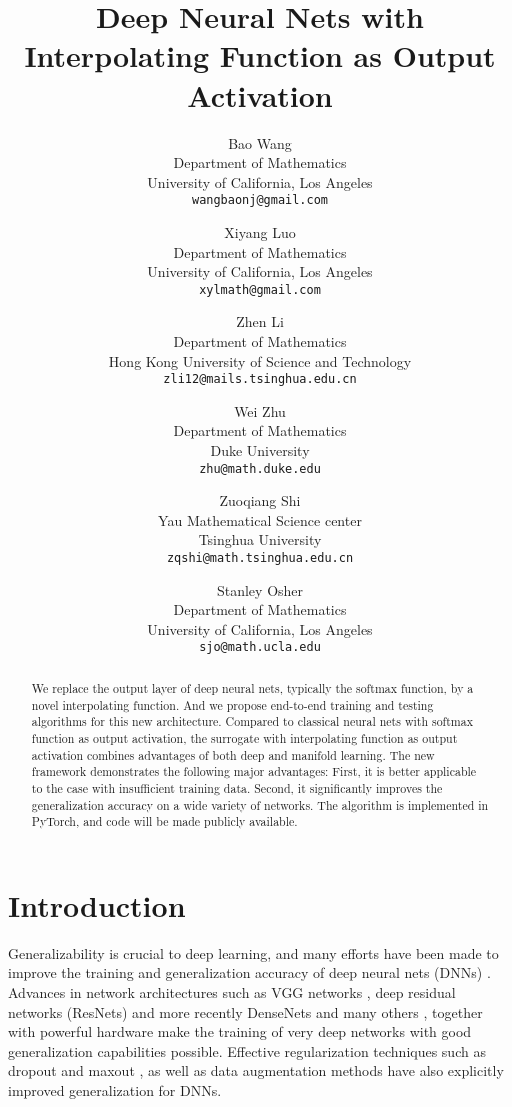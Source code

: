 \documentclass{article}
\title{Deep Neural Nets with Interpolating Function as Output Activation}
\author{
  Bao Wang \\
  Department of Mathematics\\
  University of California, Los Angeles\\
   \texttt{wangbaonj@gmail.com} \\
  \and
  Xiyang Luo \\
  Department of Mathematics\\
  University of California, Los Angeles\\
   \texttt{xylmath@gmail.com} \\
  \and
  Zhen Li \\
  Department of Mathematics\\
  Hong Kong University of Science and Technology\\
   \texttt{zli12@mails.tsinghua.edu.cn} \\
\and
  Wei Zhu \\
  Department of Mathematics\\
  Duke University\\
  \texttt{zhu@math.duke.edu} \\
\and
  Zuoqiang Shi \\
  Yau Mathematical Science center\\
  Tsinghua University\\
  \texttt{zqshi@math.tsinghua.edu.cn}\\
  \and
  Stanley Osher \\
  Department of Mathematics\\
  University of California, Los Angeles\\
  \texttt{sjo@math.ucla.edu}\\
}
\begin{document}

\maketitle

\begin{abstract}
We replace the output layer of deep neural nets, typically the softmax function, by a novel interpolating function. And we propose end-to-end training and testing algorithms for this new architecture. Compared to classical neural nets with softmax function as output activation, the surrogate with interpolating function as output activation combines advantages of both deep and manifold learning. The new framework demonstrates the following major advantages: First, it is better applicable to the case with insufficient training data. Second, it significantly improves the generalization accuracy on a wide variety of networks. The algorithm is implemented in PyTorch, and code will  be made publicly available.
\end{abstract}

\section{Introduction}
Generalizability is crucial to deep learning, and many efforts have been made to improve the training and generalization accuracy of deep neural nets (DNNs) \cite{GreedyTraining:2007,DBN:2006}. Advances in network architectures such as VGG networks \cite{VGG:2014}, deep residual networks (ResNets)\cite{DRN:2016,IdentityMap:2016} and more recently DenseNets \cite{Huang:2017CVPR} and many others \cite{Chen:2017NIPS}, together with powerful hardware make the training of very deep networks with good generalization capabilities possible. Effective regularization techniques such as dropout and maxout \cite{hinton2012improving, wan2013regularization, goodfellow2013maxout}, as well as data augmentation methods \cite{krizhevsky2012imagenet,VGG:2014, Zhu:2017DeepLearning} have also explicitly improved generalization for DNNs. 
\end{document}
